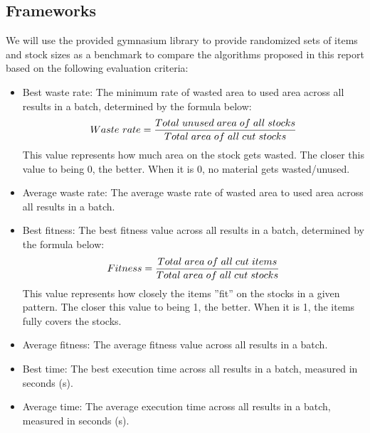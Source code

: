 \documentclass[a4paper]{article}
\begin{document}
    \subsection{Frameworks}
    We will use the provided gymnasium library to provide randomized sets of items and stock sizes as a benchmark to compare the algorithms proposed in this report based on the following evaluation criteria:
    \begin{itemize}
        \item Best waste rate: The minimum rate of wasted area to used area across all results in a batch, determined by the formula below:
        \[Waste\ rate = \frac{Total \hspace{0.1cm} unused \hspace{0.1cm} area \hspace{0.1cm} of \hspace{0.1cm} all \hspace{0.1cm} stocks}{Total \hspace{0.1cm} area \hspace{0.1cm} of \hspace{0.1cm} all \hspace{0.1cm} cut \hspace{0.1cm} stocks}\]
        This value represents how much area on the stock gets wasted.
        The closer this value to being 0, the better. When it is 0, no material gets wasted/unused.
        \item Average waste rate: The average waste rate of wasted area to used area across all results in a batch.
        \item Best fitness: The best fitness value across all results in a batch, determined by the formula below:
        \[Fitness = \frac{Total \hspace{0.1cm} area \hspace{0.1cm} of \hspace{0.1cm} all \hspace{0.1cm} cut \hspace{0.1cm} items}{Total \hspace{0.1cm} area \hspace{0.1cm} of \hspace{0.1cm} all \hspace{0.1cm} cut \hspace{0.1cm} stocks}\]
        This value represents how closely the items ''fit'' on the stocks in a given pattern.
        The closer this value to being 1, the better. When it is 1, the items fully covers the stocks.
        \item Average fitness: The average fitness value across all results in a batch.
        \item Best time: The best execution time across all results in a batch, measured in seconds (s).
        \item Average time: The average execution time across all results in a batch, measured in seconds (s).
    \end{itemize}
\end{document}
